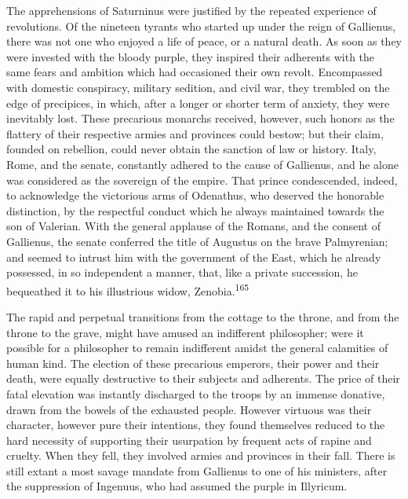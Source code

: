 The apprehensions of Saturninus were justified by the repeated
experience of revolutions. Of the nineteen tyrants who started up
under the reign of Gallienus, there was not one who enjoyed a
life of peace, or a natural death. As soon as they were invested
with the bloody purple, they inspired their adherents with the
same fears and ambition which had occasioned their own revolt.
Encompassed with domestic conspiracy, military sedition, and
civil war, they trembled on the edge of precipices, in which,
after a longer or shorter term of anxiety, they were inevitably
lost. These precarious monarchs received, however, such honors as
the flattery of their respective armies and provinces could
bestow; but their claim, founded on rebellion, could never obtain
the sanction of law or history. Italy, Rome, and the senate,
constantly adhered to the cause of Gallienus, and he alone was
considered as the sovereign of the empire. That prince
condescended, indeed, to acknowledge the victorious arms of
Odenathus, who deserved the honorable distinction, by the
respectful conduct which he always maintained towards the son of
Valerian. With the general applause of the Romans, and the
consent of Gallienus, the senate conferred the title of Augustus
on the brave Palmyrenian; and seemed to intrust him with the
government of the East, which he already possessed, in so
independent a manner, that, like a private succession, he
bequeathed it to his illustrious widow, Zenobia.\textsuperscript{165}


The rapid and perpetual transitions from the cottage to the
throne, and from the throne to the grave, might have amused an
indifferent philosopher; were it possible for a philosopher to
remain indifferent amidst the general calamities of human kind.
The election of these precarious emperors, their power and their
death, were equally destructive to their subjects and adherents.
The price of their fatal elevation was instantly discharged to
the troops by an immense donative, drawn from the bowels of the
exhausted people. However virtuous was their character, however
pure their intentions, they found themselves reduced to the hard
necessity of supporting their usurpation by frequent acts of
rapine and cruelty. When they fell, they involved armies and
provinces in their fall. There is still extant a most savage
mandate from Gallienus to one of his ministers, after the
suppression of Ingenuus, who had assumed the purple in Illyricum.

